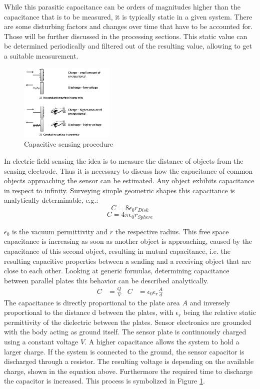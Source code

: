 While this parasitic capacitance can be orders of magnitudes higher than the capacitance that is to be measured, it is typically static in a given system. There are some disturbing factors and changes over time that have to be accounted for. Those will be further discussed in the processing sections. This static value can be determined periodically and filtered out of the resulting value, allowing to get a suitable measurement. 
\begin{figure}[h]
\centering
\includegraphics[width=0.4\textwidth]{images/cap_procedure.png}
\caption{Capacitive sensing procedure}
\label{fig:cap_procedure}
\end{figure} 
In electric field sensing the idea is to measure the distance of objects from the sensing electrode. Thus it is necessary to discuss how the capacitance of common objects approaching the sensor can be estimated. Any object exhibits capacitance in respect to infinity. Surveying simple geometric shapes this capacitance is analytically determinable, e.g.:
\begin{equation}
C=8\epsilon_{0}r_{Disk}
\end{equation}
\begin{equation}
C=4\pi\epsilon_{0}r_{Sphere}
\end{equation}

\(\epsilon_{0}\) is the vacuum permittivity and \(r\) the respective radius. This free space capacitance is increasing as soon as another object is approaching, caused by the capacitance of this second object, resulting in mutual capacitance, i.e. the resulting capacitive properties between a sending and a receiving object that are close to each other. Looking at generic formulas, determining capacitance between parallel plates this behavior can be described analytically.
\begin{align}
C&=\frac{Q}{V} & C&=\epsilon_{0}\epsilon_{r}\frac{A}{d}
\end{align}
The capacitance is directly proportional to the plate area \(A\) and inversely proportional to the distance d between the plates, with \(\epsilon_{r}\) being the relative static permittivity of the dielectric between the plates. Sensor electronics are grounded with the body acting as ground itself. The sensor plate is continuously charged using a constant voltage \(V\). A higher capacitance allows the system to hold a larger charge. If the system is connected to the ground, the sensor capacitor is discharged through a resistor. The resulting voltage is depending on the available charge, shown in the equation above. Furthermore the required time to discharge the capacitor is increased. This process is symbolized in Figure \ref{fig:cap_procedure}.


